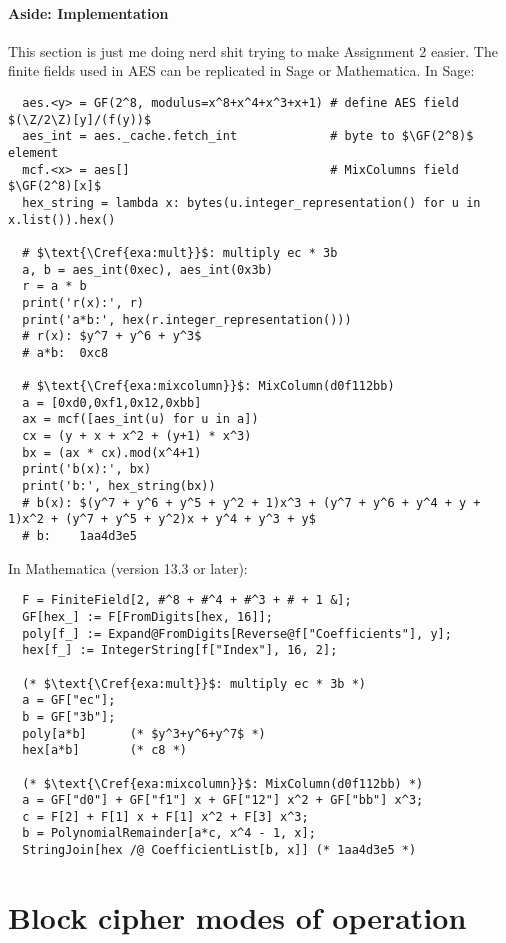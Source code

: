 \documentclass[class=co487,tikz,minted,notes]{agony}
\begin{document}
\paragraph{Aside: Implementation}
This section is just me doing nerd shit trying to make Assignment 2 easier.
The finite fields used in AES can be replicated in Sage or Mathematica.
In Sage:
\begin{verbatim}
  aes.<y> = GF(2^8, modulus=x^8+x^4+x^3+x+1) # define AES field $(\Z/2\Z)[y]/(f(y))$
  aes_int = aes._cache.fetch_int             # byte to $\GF(2^8)$ element
  mcf.<x> = aes[]                            # MixColumns field $\GF(2^8)[x]$
  hex_string = lambda x: bytes(u.integer_representation() for u in x.list()).hex()

  # $\text{\Cref{exa:mult}}$: multiply ec * 3b
  a, b = aes_int(0xec), aes_int(0x3b)
  r = a * b
  print('r(x):', r)
  print('a*b:', hex(r.integer_representation()))
  # r(x): $y^7 + y^6 + y^3$
  # a*b:  0xc8

  # $\text{\Cref{exa:mixcolumn}}$: MixColumn(d0f112bb)
  a = [0xd0,0xf1,0x12,0xbb]
  ax = mcf([aes_int(u) for u in a])
  cx = (y + x + x^2 + (y+1) * x^3)
  bx = (ax * cx).mod(x^4+1)
  print('b(x):', bx)
  print('b:', hex_string(bx))
  # b(x): $(y^7 + y^6 + y^5 + y^2 + 1)x^3 + (y^7 + y^6 + y^4 + y + 1)x^2 + (y^7 + y^5 + y^2)x + y^4 + y^3 + y$
  # b:    1aa4d3e5
\end{verbatim}

In Mathematica (version 13.3 or later):
\begin{verbatim}
  F = FiniteField[2, #^8 + #^4 + #^3 + # + 1 &];
  GF[hex_] := F[FromDigits[hex, 16]];
  poly[f_] := Expand@FromDigits[Reverse@f["Coefficients"], y];
  hex[f_] := IntegerString[f["Index"], 16, 2];

  (* $\text{\Cref{exa:mult}}$: multiply ec * 3b *)
  a = GF["ec"];
  b = GF["3b"];
  poly[a*b]      (* $y^3+y^6+y^7$ *)
  hex[a*b]       (* c8 *)

  (* $\text{\Cref{exa:mixcolumn}}$: MixColumn(d0f112bb) *)
  a = GF["d0"] + GF["f1"] x + GF["12"] x^2 + GF["bb"] x^3;
  c = F[2] + F[1] x + F[1] x^2 + F[3] x^3;
  b = PolynomialRemainder[a*c, x^4 - 1, x];
  StringJoin[hex /@ CoefficientList[b, x]] (* 1aa4d3e5 *)
\end{verbatim}


\section{Block cipher modes of operation}
\end{document}
